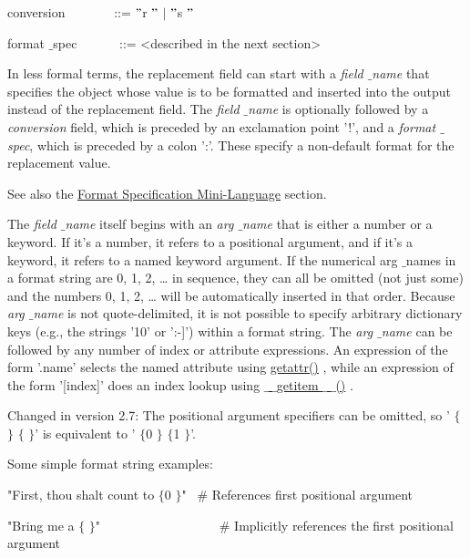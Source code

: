 \documentclass[a4paper,12pt]{report}
\begin{document}
\noindent 
conversion~~~~~~ ~::=   $ " $r $ " $  $  \vert  $  $ " $s $ " $ \par
\noindent 
format $  \_  $spec~~~~~ ~::=  <described in the next section> \par
\noindent 
In less formal terms, the replacement field can start with a \emph{field $  \_  $name} that specifies the object whose value is to be formatted and inserted into the output instead of the replacement field. The \emph{field $  \_  $name} is optionally followed by a \emph{conversion} field, which is preceded by an exclamation point '!', and a \emph{format $  \_  $spec}, which is preceded by a colon ':'. These specify a non-default format for the replacement value. \par
\noindent 
See also the \href{https://docs.python.org/2/library/string.html}{Format Specification Mini-Language}
 section. \par
\noindent 
The \emph{field $  \_  $name} itself begins with an \emph{arg $  \_  $name} that is either a number or a keyword. If it’s a number, it refers to a positional argument, and if it’s a keyword, it refers to a named keyword argument. If the numerical arg $  \_  $names in a format string are 0, 1, 2, … in sequence, they can all be omitted (not just some) and the numbers 0, 1, 2, … will be automatically inserted in that order. Because \emph{arg $  \_  $name} is not quote-delimited, it is not possible to specify arbitrary dictionary keys (e.g., the strings '10' or ':-]') within a format string. The \emph{arg $  \_  $name} can be followed by any number of index or attribute expressions. An expression of the form '.name' selects the named attribute using \href{https://docs.python.org/2/library/functions.html}{getattr()}
, while an expression of the form '[index]' does an index lookup using \href{https://docs.python.org/2/reference/datamodel.html}{ $  \_  $ $  \_  $getitem $  \_  $ $  \_  $()}
. \par
\noindent 
Changed in version 2.7: The positional argument specifiers can be omitted, so ' $  \{  $ $  \}  $  $  \{  $ $  \}  $' is equivalent to ' $  \{  $0 $  \}  $  $  \{  $1 $  \}  $'. \par
\noindent 
Some simple format string examples: \par
\noindent 
"First, thou shalt count to  $  \{  $0 $  \}  $"~  $  \#  $ References first positional argument \par
\noindent 
"Bring me a  $  \{  $ $  \}  $"~~~~~~~~~~~~~~~~~~  $  \#  $ Implicitly references the first positional argument \par
\end{document}
